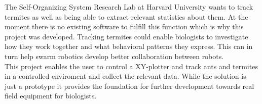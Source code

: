 


The Self-Organizing System Research Lab at Harvard University wants to track termites as well as being able to extract relevant statistics about them. At the moment there is no existing software to fulfill this function which is why this project was developed. Tracking termites could enable biologists to investigate how they work together and what behavioral patterns they express. This can in turn help swarm robotics develop better collaboration between robots. \\

This project enables the user to control a XY-plotter and track ants and termites in a controlled enviroment and collect the relevant data. While the solution is just a prototype it provides the foundation for further development towards real field equipment for biologists. 